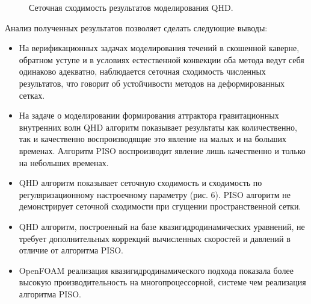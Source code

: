 \documentclass[utf8x]{G7-32} %
\begin{document}
\begin{figure}[hbt!]
    \centering
        
    \caption{
      Сеточная сходимость результатов моделирования QHD.
    }
    \label{fig:AdamsBashforthEulerNek3D}
\end{figure}

Анализ полученных результатов позволяет сделать следующие выводы:
\begin{itemize}
    \item На верификационных задачах моделирования течений в скошенной каверне, обратном уступе и в условиях естественной конвекции оба метода ведут себя одинаково адекватно, наблюдается сеточная сходимость численных результатов, что говорит об устойчивости методов на деформированных сетках.
    \item На задаче о моделировании формирования аттрактора гравитационных внутренних волн QHD алгоритм показывает результаты как количественно, так и качественно воспроизводящие это явление на малых и на больших временах. Алгоритм PISO воспроизводит явление лишь качественно и только на небольших временах.
    \item QHD алгоритм показывает сеточную сходимость и сходимость по регуляризационному настроечному параметру (рис. 6). PISO алгоритм не демонстрирует сеточной сходимости при сгущении пространственной сетки.
    \item QHD алгоритм, построенный на базе квазигидродинамических уравнений, не требует дополнительных коррекций вычисленных скоростей и давлений в отличие от алгоритма PISO.
    \item OpenFOAM реализация квазигидродинамического подхода показала более высокую производительность на многопроцессорной, системе чем реализация алгоритма PISO.
\end{itemize}
\end{document}

